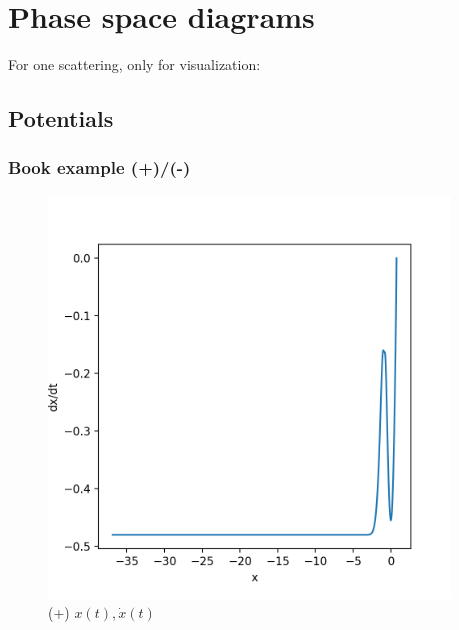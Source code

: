 \documentclass[a4paper,12pt]{article}
\begin{document}
\section{Phase space diagrams}

\par For one scattering, only for visualization:

\subsection{Potentials}

\subsubsection{Book example (+)/(-)}

\begin{figure}[H]
	\centering
	\begin{minipage}{0.5\textwidth}
		\centering
		\includegraphics[width=0.95\textwidth]{./phase-og-1.png}
		\caption{ (+) $x(t), \dot{x}(t)$ }
	\end{minipage}\hfill
	\begin{minipage}{0.5\textwidth}
		\centering

\end{minipage}
\end{figure}
\end{document}
